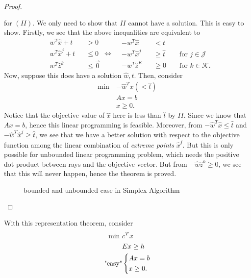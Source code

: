 \begin{proof}
\begin{enumerate}
\[		      \]
		      for \((II)\). We only need to show that \(II\) cannot have a solution. This is easy to show. Firstly,
		      we see that the above inequalities are equivalent to
		      \[
			      \begin{alignedat}{3}
				      &w^{T}\hat{x}+t&&>0\\
				      &w^{T}\hat{x}^j + t&&\leq 0\\
				      &w^{T}\hat{z}^k &&\leq \vec{0}
			      \end{alignedat}\iff\begin{alignedat}{3}
				      &-w^{T}\hat{x}&&<t\\
				      &-w^{T}\hat{x}^j &&\geq \hat{t} &&\text{ for }j\in\mathcal{J}\\
				      &-w^{T}\hat{z}^K &&\geq 0 &&\text{ for }k\in\mathcal{K}.
			      \end{alignedat}
		      \]
		      Now, suppose this does have a solution \(\hat{w}, \hat{t}\). Then, consider
		      \begin{align*}
			      \min~ & -\hat{w}^{T}x(<\hat{t}) \\
			            & Ax = b                  \\
			            & x\geq 0.
		      \end{align*}
		      Notice that the objective value of \(\hat{x}\) here is less than \(\hat{t}\) by \(II\). Since we know that
		      \(Ax = b\), hence this linear programming is feasible. Moreover, from \(-\hat{w}^{T}\hat{x}\leq \hat{t}\) and
		      \(-\hat{w}^{T}\hat{x}^j\geq \hat{t}\), we see that we have a better solution with respect to the objective function
		      among the linear combination of \emph{extreme points} \(\hat{x}^j\). But this is only possible for unbounded linear
		      programming problem, which needs the positive dot product between rays and the objective vector. But from
		      \(-\hat{w}\hat{z}^k\geq 0\), we see that this will never happen, hence the theorem is proved.
		      \begin{figure}[H]
			      \centering
			      \caption{bounded and unbounded case in Simplex Algorithm}
			      \label{fig:representation-theorem}
		      \end{figure}
	\end{enumerate}
\end{proof}

With this representation theorem, consider
\begin{align*}
	\min~         & c^Tx                       \\
	              & Ex\geq h                   \\
	\text{"easy"} & \begin{dcases}
		Ax = b \\
		x\geq 0.
	\end{dcases}
\end{align*}

